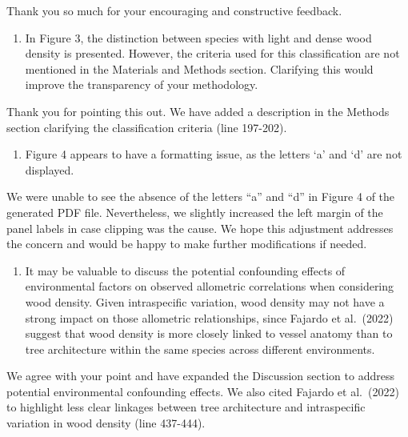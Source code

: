 \documentclass[
  12pt,
  letterpaper,
  DIV=11,
  numbers=noendperiod]{scrartcl}
\providecommand{\tightlist}{%
  \setlength{\itemsep}{0pt}\setlength{\parskip}{0pt}}\usepackage{longtable,booktabs,array}
\renewenvironment{quote}
  {\begin{customblockquote}\color{blockquote-text}\ignorespaces}
  {\end{customblockquote}}
\begin{document}
Thank you so much for your encouraging and constructive feedback.

\begin{quote}
\begin{enumerate}
\def\labelenumi{\arabic{enumi})}
\tightlist
\item
  In Figure 3, the distinction between species with light and dense wood
  density is presented. However, the criteria used for this
  classification are not mentioned in the Materials and Methods section.
  Clarifying this would improve the transparency of your methodology.
\end{enumerate}
\end{quote}

Thank you for pointing this out. We have added a description in the
Methods section clarifying the classification criteria (line 197-202).

\begin{quote}
\begin{enumerate}
\def\labelenumi{\arabic{enumi})}
\setcounter{enumi}{1}
\tightlist
\item
  Figure 4 appears to have a formatting issue, as the letters `a' and
  `d' are not displayed.
\end{enumerate}
\end{quote}

We were unable to see the absence of the letters ``a'' and ``d'' in
Figure 4 of the generated PDF file. Nevertheless, we slightly increased
the left margin of the panel labels in case clipping was the cause. We
hope this adjustment addresses the concern and would be happy to make
further modifications if needed.

\begin{quote}
\begin{enumerate}
\def\labelenumi{\arabic{enumi})}
\setcounter{enumi}{2}
\tightlist
\item
  It may be valuable to discuss the potential confounding effects of
  environmental factors on observed allometric correlations when
  considering wood density. Given intraspecific variation, wood density
  may not have a strong impact on those allometric relationships, since
  Fajardo et al.~(2022) suggest that wood density is more closely linked
  to vessel anatomy than to tree architecture within the same species
  across different environments.
\end{enumerate}
\end{quote}

We agree with your point and have expanded the Discussion section to
address potential environmental confounding effects. We also cited
Fajardo et al.~(2022) to highlight less clear linkages between tree
architecture and intraspecific variation in wood density (line 437-444).
\end{document}
